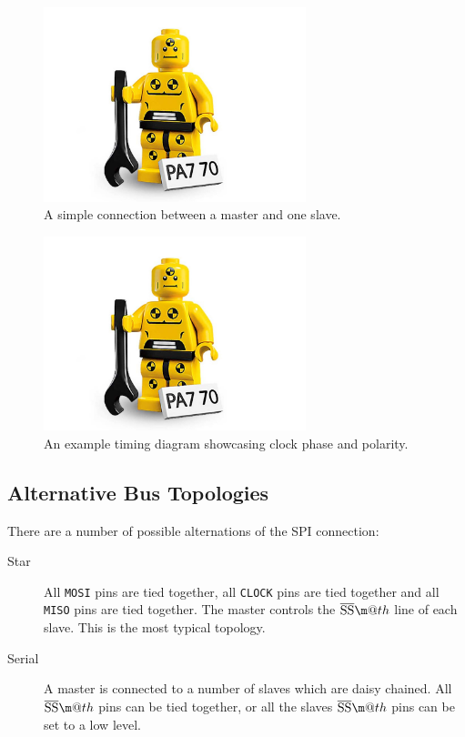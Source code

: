 \documentclass[journal]{IEEEtran}
\makeatletter
\newcommand{\mosi}{\texttt{MOSI}\xspace}
\newcommand{\miso}{\texttt{MISO}\xspace}
\newcommand{\clock}{\texttt{CLOCK}\xspace}
\renewcommand{\ss}{\texttt{\textoverline{SS}}\xspace}
\newcommand*{\textoverline}[1]{$\overline{\hbox{#1}}\m@th$}
\makeatother
\begin{document}
\begin{figure}[!t]
\centering
\includegraphics[width=3in]{dummy}
\caption{A simple connection between a master and one slave.\cite{spi_blockguide}}
\label{simple_spi_con}
\end{figure}

\begin{figure}[!t]
\centering
\includegraphics[width=3in]{dummy}
\caption{An example timing diagram showcasing clock phase and polarity.\cite{spi_c68hcp11a1vp}}
\label{spi_cpol_cpha}
\end{figure}

\subsection{Alternative Bus Topologies}
There are a number of possible alternations of the SPI connection:
\begin{description}
	\item [Star] All \mosi pins are tied together, all \clock pins are tied together and all \miso pins are tied together. The master controls the \ss line of each slave. This is the most typical topology.
	\item [Serial] A master is connected to a number of slaves which are daisy chained. All \ss pins can be tied together, or all the slaves \ss pins can be set to a low level.
\end{description}
\end{document}
